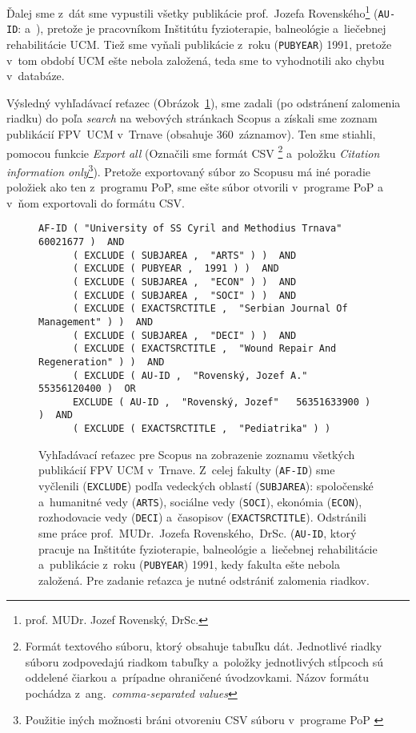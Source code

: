 Ďalej sme z~dát sme vypustili všetky publikácie prof.~Jozefa
Rovenského\footnote{prof. MUDr. Jozef Rovenský, DrSc.}  (\texttt{AU-ID}:  a~), pretože je pracovníkom Inštitútu fyzioterapie, balneológie
a~liečebnej rehabilitácie UCM.  Tiež sme vyňali publikácie z~roku
(\texttt{PUBYEAR}) 1991, pretože v~tom období UCM ešte nebola založená, teda sme
to vyhodnotili ako chybu v~databáze.

Výsledný vyhľadávací reťazec (Obrázok~\ref{fig:scopus.query}), sme zadali (po
odstránení zalomenia riadku) do poľa \emph{search} na webových stránkach Scopus
a získali sme zoznam publikácií FPV~UCM v~Trnave (obsahuje 360~záznamov).  Ten
sme stiahli, pomocou funkcie \emph{Export all} (Označili sme formát CSV%
\footnote{Formát textového súboru, ktorý obsahuje tabuľku dát.  Jednotlivé
  riadky súboru zodpovedajú riadkom tabuľky a~položky jednotlivých stĺpcoch sú
  oddelené čiarkou a~prípadne ohraničené úvodzovkami.  Názov formátu pochádza
  z~ang.~\emph{comma-separated values}} a~položku \emph{Citation information
  only}\footnote{Použitie iných možnosti bráni otvoreniu CSV súboru v~programe
  PoP \citep{Harzing2011}}).  Pretože exportovaný súbor zo Scopusu má iné
poradie položiek ako ten z~programu PoP, sme ešte súbor otvorili v~programe PoP
a v~ňom exportovali do formátu CSV.


\begin{figure}
  \footnotesize
  \begin{Verbatim}[frame=single]
    AF-ID ( "University of SS Cyril and Methodius Trnava"   60021677 )  AND
      ( EXCLUDE ( SUBJAREA ,  "ARTS" ) )  AND
      ( EXCLUDE ( PUBYEAR ,  1991 ) )  AND
      ( EXCLUDE ( SUBJAREA ,  "ECON" ) )  AND
      ( EXCLUDE ( SUBJAREA ,  "SOCI" ) )  AND
      ( EXCLUDE ( EXACTSRCTITLE ,  "Serbian Journal Of Management" ) )  AND
      ( EXCLUDE ( SUBJAREA ,  "DECI" ) )  AND
      ( EXCLUDE ( EXACTSRCTITLE ,  "Wound Repair And Regeneration" ) )  AND
      ( EXCLUDE ( AU-ID ,  "Rovenský, Jozef A."   55356120400 )  OR
      EXCLUDE ( AU-ID ,  "Rovenský, Jozef"   56351633900 ) )  AND
      ( EXCLUDE ( EXACTSRCTITLE ,  "Pediatrika" ) )
  \end{Verbatim}
  \vspace*{-4mm}
  \caption[Vyhľadávací reťazec pre celú fakultu pre Scopus]%
  {Vyhľadávací reťazec pre Scopus na zobrazenie zoznamu všetkých publikácií FPV
    UCM v~Trnave.  Z~celej fakulty (\texttt{AF-ID}) sme vyčlenili
    (\texttt{EXCLUDE}) podľa vedeckých oblastí (\texttt{SUBJAREA}): spoločenské
    a~humanitné vedy (\texttt{ARTS}), sociálne vedy (\texttt{SOCI}), ekonómia
    (\texttt{ECON}), rozhodovacie vedy (\texttt{DECI}) a~časopisov
    (\texttt{EXACTSRCTITLE}).  Odstránili sme práce prof.~MUDr.~Jozefa
    Rovenského,~DrSc.  (\texttt{AU-ID}, ktorý pracuje na Inštitúte
    fyzioterapie, balneológie a~liečebnej rehabilitácie a~publikácie z~roku
    (\texttt{PUBYEAR}) 1991, kedy fakulta ešte nebola založená.  Pre zadanie
    reťazca je nutné odstrániť zalomenia riadkov.}
  \label{fig:scopus.query}
\end{figure}


